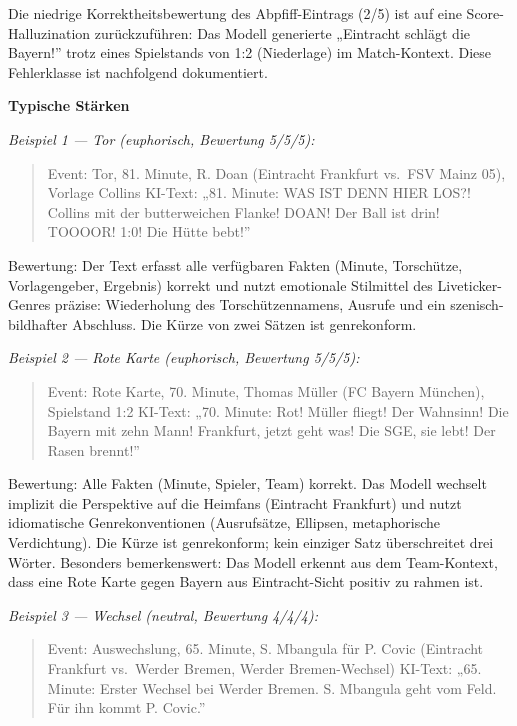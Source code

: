 Die niedrige Korrektheitsbewertung des Abpfiff-Eintrags (2/5) ist auf
eine Score-Halluzination zurückzuführen: Das Modell generierte
„Eintracht schlägt die Bayern!'' trotz eines Spielstands von 1:2
(Niederlage) im Match-Kontext. Diese Fehlerklasse ist nachfolgend
dokumentiert.

\textbf{Typische Stärken}

\emph{Beispiel 1 --- Tor (euphorisch, Bewertung 5/5/5):}

\begin{quote}
Event: Tor, 81. Minute, R. Doan (Eintracht Frankfurt vs.~FSV Mainz 05),
Vorlage Collins KI-Text: „81. Minute: WAS IST DENN HIER LOS?! Collins
mit der butterweichen Flanke! DOAN! Der Ball ist drin! TOOOOR! 1:0! Die
Hütte bebt!''
\end{quote}

Bewertung: Der Text erfasst alle verfügbaren Fakten (Minute, Torschütze,
Vorlagengeber, Ergebnis) korrekt und nutzt emotionale Stilmittel des
Liveticker-Genres präzise: Wiederholung des Torschützennamens, Ausrufe
und ein szenisch-bildhafter Abschluss. Die Kürze von zwei Sätzen ist
genrekonform.

\emph{Beispiel 2 --- Rote Karte (euphorisch, Bewertung 5/5/5):}

\begin{quote}
Event: Rote Karte, 70. Minute, Thomas Müller (FC Bayern München),
Spielstand 1:2 KI-Text: „70. Minute: Rot! Müller fliegt! Der Wahnsinn!
Die Bayern mit zehn Mann! Frankfurt, jetzt geht was! Die SGE, sie lebt!
Der Rasen brennt!''
\end{quote}

Bewertung: Alle Fakten (Minute, Spieler, Team) korrekt. Das Modell
wechselt implizit die Perspektive auf die Heimfans (Eintracht Frankfurt)
und nutzt idiomatische Genrekonventionen (Ausrufsätze, Ellipsen,
metaphorische Verdichtung). Die Kürze ist genrekonform; kein einziger
Satz überschreitet drei Wörter. Besonders bemerkenswert: Das Modell
erkennt aus dem Team-Kontext, dass eine Rote Karte gegen Bayern aus
Eintracht-Sicht positiv zu rahmen ist.

\emph{Beispiel 3 --- Wechsel (neutral, Bewertung 4/4/4):}

\begin{quote}
Event: Auswechslung, 65. Minute, S. Mbangula für P. Covic (Eintracht
Frankfurt vs.~Werder Bremen, Werder Bremen-Wechsel) KI-Text: „65.
Minute: Erster Wechsel bei Werder Bremen. S. Mbangula geht vom Feld. Für
ihn kommt P. Covic.''
\end{quote}

